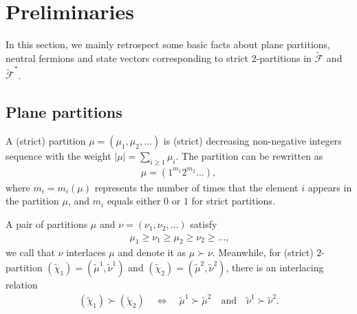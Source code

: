 \documentclass[11pt,reqno]{amsart}
\numberwithin{equation}{section}
\begin{document}
	
	
	\section{Preliminaries}
	In this section, we mainly retrospect some basic facts about plane partitions, neutral fermions and  state vectors corresponding to  strict $2$-partitions in $\tilde{\mathcal{F}}$ and $\tilde{\mathcal{F}}^*$\cite{Mac,BUC,boshilunwen,UC-BUC}.
	\subsection{Plane partitions}
	
	A (strict) partition  $\mu=(\mu_{1},\mu_{2},\ldots)$ is (strict) decreasing non-negative integers sequence with the weight $|\mu|=\sum\limits_{i\geq1}\mu_i$.
	The partition can be rewritten as
	\begin{align}
		\mu=(1^{m_{1}}2^{m_{2}}...),
	\end{align}
	where $m_{i}=m_{i}(\mu)$ represents the number of  times that the element $i$  appears  in  the partition $\mu$, and $m_{i}$ equals either $0$ or $1$ for strict partitions.
	
	
	
	A pair of partitions $\mu$ and $\nu=(\nu_{1},\nu_{2},\ldots)$ satisfy
	\begin{eqnarray}\
		\mu_{1}\geq\nu_{1}\geq\mu_{2}\geq\nu_{2}\geq\ldots,
	\end{eqnarray}
	we call that $\nu$ interlaces $\mu$ and denote it as $\mu\succ\nu$.
	Meanwhile, for (strict) $2$-partition $(\tilde{\chi}_1)= (\tilde{\mu}^1,\tilde{\nu}^1 )$ and $(\tilde{\chi}_2)= (\tilde{\mu}^2,\tilde{\nu}^2 )$, there is an interlacing relation
	\begin{align}
		(\tilde{\chi}_1)\succ(\tilde{\chi}_2)  \quad\Longleftrightarrow\quad    \tilde{\mu}^1\succ\tilde{\mu}^2 \quad \mathrm{and} \quad \tilde{\nu}^1 \succ \tilde{\nu}^2.
	\end{align}
	
\end{document}
